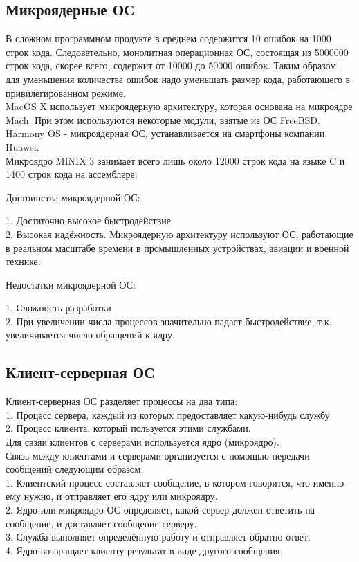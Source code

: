 \documentclass[a4paper]{article}
\begin{document}
\subsection{Микроядерные ОС}
В сложном программном продукте в среднем содержится 10 ошибок на 1000 строк кода. Следовательно, монолитная операционная ОС, состоящая из 5000000 строк кода, скорее всего, содержит от 10000 до 50000 ошибок. Таким образом, для уменьшения количества ошибок надо уменьшать размер кода, работающего в привилегированном режиме.\\
MacOS X использует микроядерную архитектуру, которая основана на микроядре Mach. При этом используются некоторые модули, взятые из ОС FreeBSD.\\
Harmony OS - микроядерная ОС, устанавливается на смартфоны компании Huawei.\\
Микроядро MINIX 3 занимает всего лишь около 12000 строк кода на языке C и 1400 строк кода на ассемблере.\\
\begin{center}
	Достоинства микроядерной ОС:
\end{center}
1. Достаточно высокое быстродействие\\
2. Высокая надёжность. Микроядерную архитектуру используют ОС, работающие в реальном масштабе времени в промышленных устройствах, авиации и военной технике.\\
\begin{center}
	Недостатки микроядерной ОС:
\end{center}
1. Сложность разработки\\
2. При увеличении числа процессов значительно падает быстродействие, т.к. увеличивается число обращений к ядру.
\subsection{Клиент-серверная ОС}
Клиент-серверная ОС разделяет процессы на два типа:\\
1. Процесс сервера, каждый из которых предоставляет какую-нибудь службу\\
2. Процесс клиента, который пользуется этими службами.\\
Для свзяи клиентов с серверами используется ядро (микроядро).\\
Связь между клиентами и серверами организуется с помощью передачи сообщений следующим образом:\\
1. Клиентский процесс составляет сообщение, в котором говорится, что именно ему нужно, и отправляет его ядру или микроядру.\\
2. Ядро или микроядро ОС определяет, какой сервер должен ответить на сообщение, и доставляет сообщение серверу.\\
3. Служба выполняет определённую работу и отправляет обратно ответ.\\
4. Ядро возвращает клиенту результат в виде другого сообщения.\\
\end{document}
